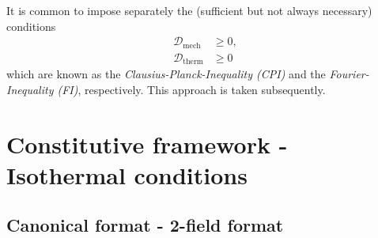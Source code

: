 It is common to impose separately the (sufficient but not always necessary) conditions
\begin{subequations}\label{eq:vol_I_ch02_eq38}
\begin{align}
  \mathcal{D}_{\mathrm{mech}} &\geq 0,
\label{eq:vol_I_ch02_eq38a} \\
  \mathcal{D}_{\mathrm{therm}} &\geq 0
 \label{eq:vol_I_ch02_eq38b}
\end{align}
\end{subequations}
which are known as the {\em Clausius-Planck-Inequality (CPI)} and the {\em Fourier-Inequality (FI)}, respectively. This approach is taken subsequently.

\section{Constitutive framework - Isothermal conditions}

\subsection{Canonical format - 2-field format}

